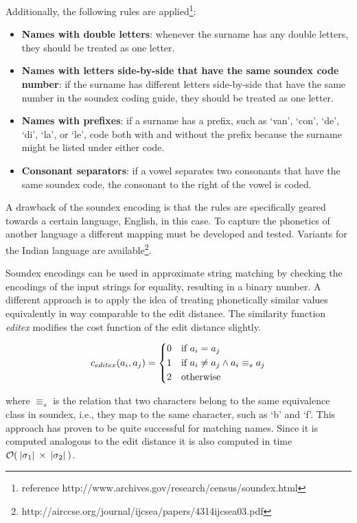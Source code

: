 \documentclass[paper=a4, fontsize=11pt]{scrartcl}
\begin{document}
Additionally, the following rules are applied\footnote{reference http://www.archives.gov/research/census/soundex.html}:

\begin{itemize}
    \item \textbf{Names with double letters}: whenever the surname has any double letters, they should be treated as one letter.
    \item \textbf{Names with letters side-by-side that have the same soundex code number}: if the surname has different letters side-by-side that have the same number in the soundex coding guide, they should be treated as one letter.
    \item \textbf{Names with prefixes}: if a surname has a prefix, such as `van', `con', `de', `di', `la', or `le', code both with and without the prefix because the surname might be listed under either code.
    \item \textbf{Consonant separators}: if a vowel separates two consonants that have the same soundex code, the consonant to the right of the vowel is coded.
\end{itemize}

A drawback of the soundex encoding is that the rules are specifically geared towards a certain language, English, in this case.
To capture the phonetics of another language a different mapping must be developed and tested.
Variants for the Indian language are available\footnote{http://airccse.org/journal/ijcsea/papers/4314ijcsea03.pdf}.

Soundex encodings can be used in approximate string matching by checking the encodings of the input strings for equality, resulting in a binary number.
A different approach is to apply the idea of treating phonetically similar values equivalently in way comparable to the edit distance.
The similarity function \emph{editex} modifies the cost function of the edit distance slightly.

\begin{equation}
    c_{editex}(a_i, a_j) =
    \begin{dcases}
        0 & \text{if } a_i = a_j \\
        1 & \text{if } a_i \neq a_j \wedge a_i \equiv_s a_j \\
        2 & \text{otherwise}
    \end{dcases}
\end{equation}

\noindent where $\equiv_s$ is the relation that two characters belong to the same equivalence class in soundex, i.e., they map to the same character, such as `b' and `f'.
This approach has proven to be quite successful for matching names\cite{zobel96}.
Since it is computed analogous to the edit distance it is also computed in time $\mathcal{O}(\:\vert {\sigma_1} \vert\: \times \:\vert {\sigma_2} \vert\:)$.
\end{document}
